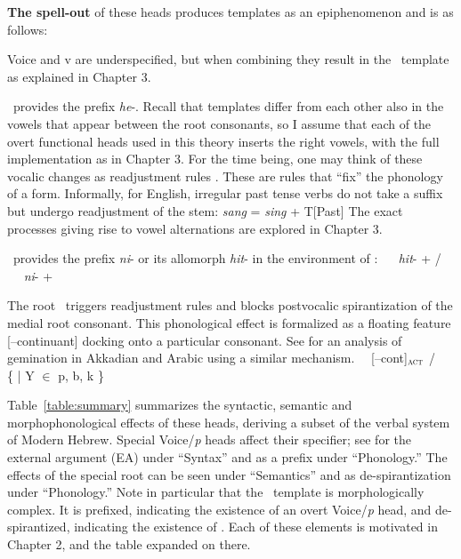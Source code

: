 \textbf{The spell-out} of these heads produces templates as an epiphenomenon and is as follows: 

Voice and v are underspecified, but when combining they result in the \tkal~template as explained in Chapter 3.

\vd~provides the prefix \emph{he}-. Recall that templates differ from each other also in the vowels that appear between the root consonants, so I assume that each of the overt functional heads used in this theory inserts the right vowels, with the full implementation as in Chapter 3. For the time being, one may think of these vocalic changes as readjustment rules \citep{embickhalle05}. These are rules that ``fix'' the phonology of a form. Informally, for English, irregular past tense verbs do not take a suffix but undergo readjustment of the stem:
\ex \emph{sang} = \emph{sing} + T[Past]
\xe
The exact processes giving rise to vowel alternations are explored in Chapter 3.

\vz~provides the prefix \emph{ni}- or its allomorph \emph{hit}- in the environment of \va:
\pex
\a \vz~\lra~ \emph{hit}- +  / \trace~\va
\a \vz~\lra~ \emph{ni}- + 
\xe

The root \va~triggers readjustment rules and blocks postvocalic spirantization of the medial root consonant. This phonological effect is formalized as a floating feature [--continuant] docking onto a particular consonant. See \cite{katie13} for an analysis of gemination in Akkadian and Arabic using a similar mechanism.
\ex \va~\lra~[--cont]$_{\gsc{ACT}}$ / \trace~ \{  | Y $\in$ p, b, k \}
\xe

Table~\ref{table:summary} summarizes the syntactic, semantic and morphophonological effects of these heads, deriving a subset of the verbal system of Modern Hebrew. Special Voice/\emph{p} heads affect their specifier; see for the external argument (EA) under ``Syntax'' and as a prefix under ``Phonology.'' The effects of the special root {\va} can be seen under ``Semantics'' and as de-spirantization under ``Phonology.'' Note in particular that the \thit~template is morphologically complex. It is prefixed, indicating the existence of an overt Voice/\emph{p} head, and de-spirantized, indicating the existence of \va. Each of these elements is motivated in Chapter 2, and the table expanded on there.


